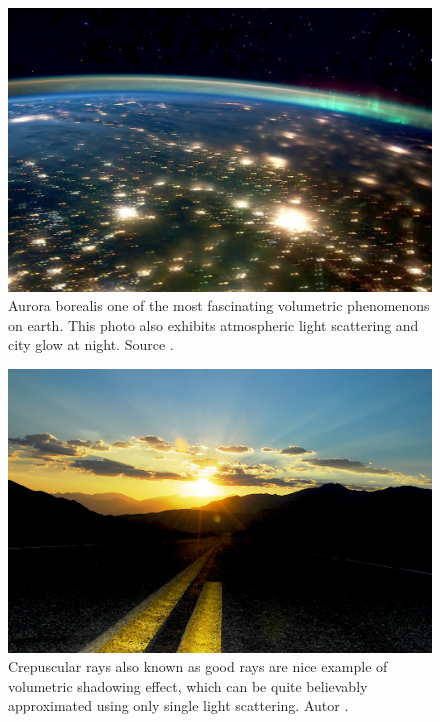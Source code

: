 \begin{minipage}{\linewidth}
      \begin{minipage}{0.45\linewidth}
          \begin{figure}[H]
              \includegraphics[width=\linewidth]{images/nasaearth.jpg}
              \captionsetup{width=\linewidth}
              \caption[Aurora borealis.]{Aurora borealis one of the most fascinating volumetric phenomenons on earth. This photo also exhibits atmospheric light scattering and city glow at night. Source \cite{AURO}.}\label{fig:AURO}
          \end{figure}
      \end{minipage}
      \hspace{0.05\linewidth}
      \begin{minipage}{0.45\linewidth}
          \begin{figure}[H]
              \includegraphics[width=\linewidth]{01_Intro/images/sunset.jpg}
              \captionsetup{width=\linewidth}
              \caption[Crepuscular rays.]{Crepuscular rays also known as good rays are nice example of volumetric shadowing effect, which can be quite believably approximated using only single light scattering. Autor \cite{PETR}.}\label{fig:PETR}
          \end{figure}
      \end{minipage}
  \end{minipage}

